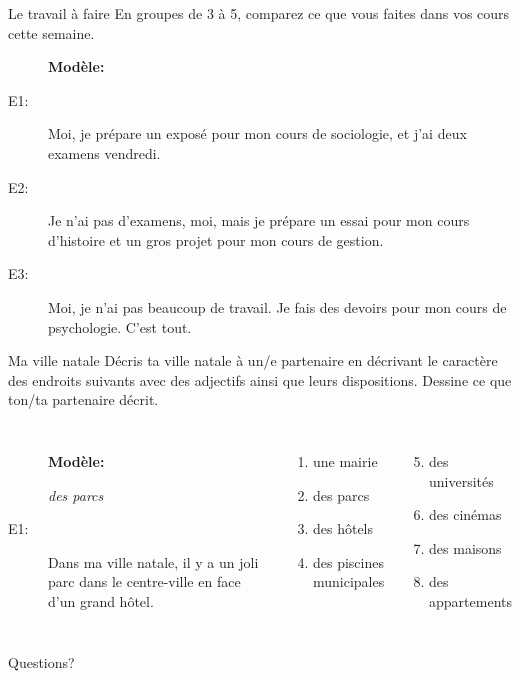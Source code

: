 \documentclass{beamer}
\begin{document}
  \begin{frame}{Le travail à faire}
    En groupes de 3 à 5, comparez ce que vous faites dans vos cours cette semaine. \\
    \begin{description}
      \item[] \textbf{Modèle:}
      \item[E1:] Moi, je prépare un exposé pour mon cours de sociologie, et j'ai deux examens vendredi.
      \item[E2:] Je n'ai pas d'examens, moi, mais je prépare un essai pour mon cours d'histoire et un gros projet pour mon cours de gestion.
      \item[E3:] Moi, je n'ai pas beaucoup de travail. Je fais des devoirs pour mon cours de psychologie. C'est tout.
    \end{description}
  \end{frame}

  \begin{frame}{Ma ville natale}
    Décris ta ville natale à un/e partenaire en décrivant le caractère des endroits suivants avec des adjectifs ainsi que leurs dispositions.
    Dessine ce que ton/ta partenaire décrit. \\
    \vspace{0.25cm}
    \begin{columns}[t]
        \begin{description}
          \item[] \textbf{Modèle:}
          \item[] \emph{des parcs}
          \item[E1:] Dans ma ville natale, il y a un joli parc dans le centre-ville en face d'un grand hôtel.
        \end{description}
        \begin{enumerate}
          \item une mairie
          \item des parcs
          \item des hôtels
          \item des piscines municipales
        \end{enumerate}
        \begin{enumerate}
          \setcounter{enumi}{4}
          \item des universités
          \item des cinémas
          \item des maisons
          \item des appartements
        \end{enumerate}
    \end{columns}
  \end{frame}

  \begin{frame}{}
    \begin{center}
      \Large Questions?
    \end{center}
  \end{frame}
\end{document}

